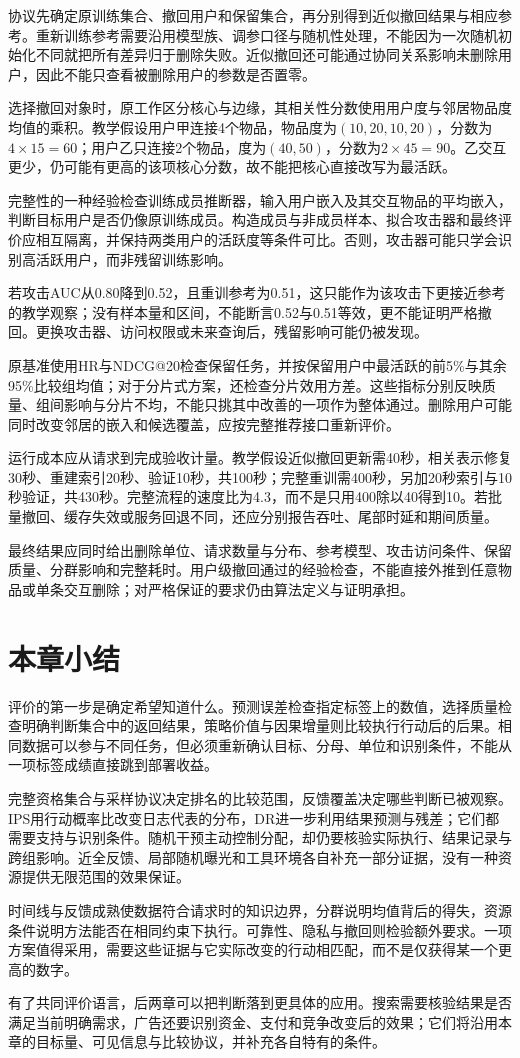 协议先确定原训练集合、撤回用户和保留集合，再分别得到近似撤回结果与相应参考。重新训练参考需要沿用模型族、调参口径与随机性处理，不能因为一次随机初始化不同就把所有差异归于删除失败。近似撤回还可能通过协同关系影响未删除用户，因此不能只查看被删除用户的参数是否置零。

选择撤回对象时，原工作区分核心与边缘，其相关性分数使用用户度与邻居物品度均值的乘积。教学假设用户甲连接4个物品，物品度为$(10,20,10,20)$，分数为$4\times15=60$；用户乙只连接2个物品，度为$(40,50)$，分数为$2\times45=90$。乙交互更少，仍可能有更高的该项核心分数，故不能把核心直接改写为最活跃。

完整性的一种经验检查训练成员推断器，输入用户嵌入及其交互物品的平均嵌入，判断目标用户是否仍像原训练成员。构造成员与非成员样本、拟合攻击器和最终评价应相互隔离，并保持两类用户的活跃度等条件可比。否则，攻击器可能只学会识别高活跃用户，而非残留训练影响。

若攻击AUC从0.80降到0.52，且重训参考为0.51，这只能作为该攻击下更接近参考的教学观察；没有样本量和区间，不能断言0.52与0.51等效，更不能证明严格撤回。更换攻击器、访问权限或未来查询后，残留影响可能仍被发现。

原基准使用HR与NDCG@20检查保留任务，并按保留用户中最活跃的前5\%与其余95\%比较组均值；对于分片式方案，还检查分片效用方差。这些指标分别反映质量、组间影响与分片不均，不能只挑其中改善的一项作为整体通过。删除用户可能同时改变邻居的嵌入和候选覆盖，应按完整推荐接口重新评价。

运行成本应从请求到完成验收计量。教学假设近似撤回更新需40秒，相关表示修复30秒、重建索引20秒、验证10秒，共100秒；完整重训需400秒，另加20秒索引与10秒验证，共430秒。完整流程的速度比为4.3，而不是只用400除以40得到10。若批量撤回、缓存失效或服务回退不同，还应分别报告吞吐、尾部时延和期间质量。

最终结果应同时给出删除单位、请求数量与分布、参考模型、攻击访问条件、保留质量、分群影响和完整耗时。用户级撤回通过的经验检查，不能直接外推到任意物品或单条交互删除；对严格保证的要求仍由算法定义与证明承担。

\section{本章小结}
\label{sec:rs-evaluation-summary}

评价的第一步是确定希望知道什么。预测误差检查指定标签上的数值，选择质量检查明确判断集合中的返回结果，策略价值与因果增量则比较执行行动后的后果。相同数据可以参与不同任务，但必须重新确认目标、分母、单位和识别条件，不能从一项标签成绩直接跳到部署收益。

完整资格集合与采样协议决定排名的比较范围，反馈覆盖决定哪些判断已被观察。IPS用行动概率比改变日志代表的分布，DR进一步利用结果预测与残差；它们都需要支持与识别条件。随机干预主动控制分配，却仍要核验实际执行、结果记录与跨组影响。近全反馈、局部随机曝光和工具环境各自补充一部分证据，没有一种资源提供无限范围的效果保证。

时间线与反馈成熟使数据符合请求时的知识边界，分群说明均值背后的得失，资源条件说明方法能否在相同约束下执行。可靠性、隐私与撤回则检验额外要求。一项方案值得采用，需要这些证据与它实际改变的行动相匹配，而不是仅获得某一个更高的数字。

有了共同评价语言，后两章可以把判断落到更具体的应用。搜索需要核验结果是否满足当前明确需求，广告还要识别资金、支付和竞争改变后的效果；它们将沿用本章的目标量、可见信息与比较协议，并补充各自特有的条件。
